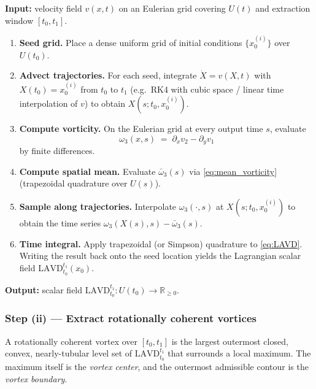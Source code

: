 \documentclass[../main.tex]{subfiles}
\begin{document}
\begin{result}
\textbf{Input:} velocity field $v(x,t)$ on an Eulerian grid covering $U(t)$ and extraction window $[t_0,t_1]$.
\begin{enumerate}
    \item[(I.1)] \textbf{Seed grid.} Place a dense uniform grid of initial conditions $\{x_0^{(i)}\}$ over $U(t_0)$.
    \item[(I.2)] \textbf{Advect trajectories.} For each seed, integrate $\dot X = v(X,t)$ with $X(t_0)=x_0^{(i)}$ from $t_0$ to $t_1$ (e.g.\ RK4 with cubic space / linear time interpolation of $v$) to obtain $X(s;t_0,x_0^{(i)})$.
    \item[(I.3)] \textbf{Compute vorticity.} On the Eulerian grid at every output time $s$, evaluate
    \[\omega_3(x,s) \;=\; \partial_x v_2 - \partial_y v_1\]
    by finite differences.
    \item[(I.4)] \textbf{Compute spatial mean.} Evaluate $\bar{\omega}_3(s)$ via \eqref{eq:mean_vorticity} (trapezoidal quadrature over $U(s)$).
    \item[(I.5)] \textbf{Sample along trajectories.} Interpolate $\omega_3(\cdot,s)$ at $X(s;t_0,x_0^{(i)})$ to obtain the time series $\omega_3(X(s),s) - \bar{\omega}_3(s)$.
    \item[(I.6)] \textbf{Time integral.} Apply trapezoidal (or Simpson) quadrature to \eqref{eq:LAVD}. Writing the result back onto the seed location yields the Lagrangian scalar field $\mathrm{LAVD}_{t_0}^{t_1}(x_0)$.
\end{enumerate}
\textbf{Output:} scalar field $\mathrm{LAVD}_{t_0}^{t_1}:U(t_0)\to\mathbb{R}_{\geq 0}$.
\end{result}

\subsubsection*{Step (ii) --- Extract rotationally coherent vortices}

\begin{definition}
A rotationally coherent vortex over $[t_0,t_1]$ is the largest outermost closed, convex, nearly-tubular level set of $\mathrm{LAVD}_{t_0}^{t_1}$ that surrounds a local maximum. The maximum itself is the \emph{vortex center}, and the outermost admissible contour is the \emph{vortex boundary}.
\end{definition}
\end{document}
